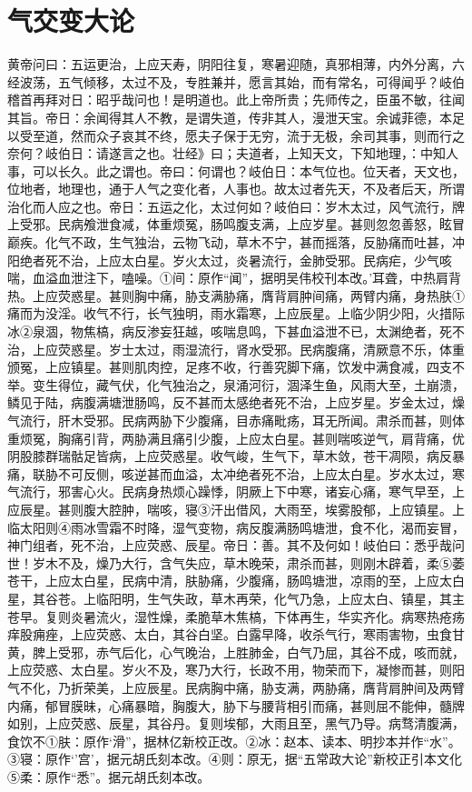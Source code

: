 \documentclass[a4paper,12pt,UTF8,twoside]{ctexbook}
\begin{document}
\chapter{气交变大论}
黄帝问曰：五运更治，上应天寿，阴阳往复，寒暑迎随，真邪相薄，内外分离，六经波荡，五气倾移，太过不及，专胜兼并，愿言其始，而有常名，可得闻乎？岐伯稽首再拜对日：昭乎哉问也！是明道也。此上帝所贵；先师传之，臣虽不敏，往闻其旨。帝日：余闻得其人不教，是谓失道，传非其人，漫泄天宝。余诚菲德，本足以受至道，然而众子哀其不终，愿夫子保于无穷，流于无极，余司其事，则而行之奈何？岐伯日：请遂言之也。壮经》曰；夫道者，上知天文，下知地理，：中知人事，可以长久。此之谓也。帝曰：何谓也？岐伯日：本气位也。位天者，天文也，位地者，地理也，通于人气之变化者，人事也。故太过者先天，不及者后天，所谓治化而人应之也。帝日：五运之化，太过何如？岐伯曰：岁木太过，风气流行，牌上受邪。民病飧泄食减，体重烦冤，肠鸣腹支满，上应岁星。甚则忽忽善怒，眩冒巅疾。化气不政，生气独治，云物飞动，草木不宁，甚而摇落，反胁痛而吐甚，冲阳绝者死不治，上应太白星。岁火太过，炎暑流行，金肺受邪。民病疟，少气咳喘，血溢血泄注下，嗑噪。①间：原作“闻”，据明吴伟校刊本改。’耳聋，中热肩背热。上应荧惑星。甚则胸中痛，胁支满胁痛，膺背肩肿间痛，两臂内痛，身热肤①痛而为没淫。收气不行，长气独明，雨水霜寒，上应辰星。上临少阴少阳，火措际冰②泉涸，物焦槁，病反渗妄狂越，咳喘息鸣，下甚血溢泄不已，太渊绝者，死不治，上应荧惑星。岁士太过，雨湿流行，肾水受邪。民病腹痛，清厥意不乐，体重颁冤，上应镇星。甚则肌肉控，足疼不收，行善究脚下痛，饮发中满食减，四支不举。变生得位，藏气伏，化气独治之，泉涌河衍，涸泽生鱼，风雨大至，土崩溃，鳞见于陆，病腹满塘泄肠鸣，反不甚而太感绝者死不治，上应岁星。岁金太过，燥气流行，肝木受邪。民病两胁下少腹痛，目赤痛毗疡，耳无所闻。肃杀而甚，则体重烦冤，胸痛引背，两胁满且痛引少腹，上应太白星。甚则喘咳逆气，肩背痛，优阴股膝群瑞骷足皆病，上应荧惑星。收气峻，生气下，草木敛，苍干凋陨，病反暴痛，联胁不可反侧，咳逆甚而血溢，太冲绝者死不治，上应太白星。岁水太过，寒气流行，邪害心火。民病身热烦心躁悸，阴厥上下中寒，诸妄心痛，寒气早至，上应辰星。甚则腹大腔肿，喘咳，寝③汗出借风，大雨至，埃雾股郁，上应镇星。上临太阳则④雨冰雪霜不时降，湿气变物，病反腹满肠鸣塘泄，食不化，渴而妄冒，神门组者，死不治，上应荧惑、辰星。帝日：善。其不及何如！岐伯曰：悉乎哉问世！岁木不及，燥乃大行，含气失应，草木晚荣，肃杀而甚，则刚木辟着，柔⑤萎苍干，上应太白星，民病中清，肤胁痛，少腹痛，肠鸣塘泄，凉雨的至，上应太白星，其谷苍。上临阳明，生气失政，草木再荣，化气乃急，上应太白、镇星，其主苍早。复则炎暑流火，湿性燥，柔脆草木焦槁，下体再生，华实齐化。病寒热疮疡痒股痈痤，上应荧惑、太白，其谷白坚。白露早降，收杀气行，寒雨害物，虫食甘黄，脾上受邪，赤气后化，心气晚治，上胜肺金，白气乃屈，其谷不成，咳而就，上应荧惑、太白星。岁火不及，寒乃大行，长政不用，物荣而下，凝惨而甚，则阳气不化，乃折荣美，上应辰星。民病胸中痛，胁支满，两胁痛，膺背肩肿间及两臂内痛，郁冒膜昧，心痛暴暗，胸腹大，胁下与腰背相引而痛，甚则屈不能伸，髓牌如别，上应荧惑、辰星，其谷丹。复则埃郁，大雨且至，黑气乃导。病骛清腹满，食饮不①肤：原作‘滑”，据林亿新校正改。②冰：赵本、读本、明抄本并作“水”。③寝：原作‘’宫’，据元胡氏刻本改。④则：原无，据“五常政大论”新校正引本文化⑤柔：原作“悉”。据元胡氏刻本改。
\end{document}

